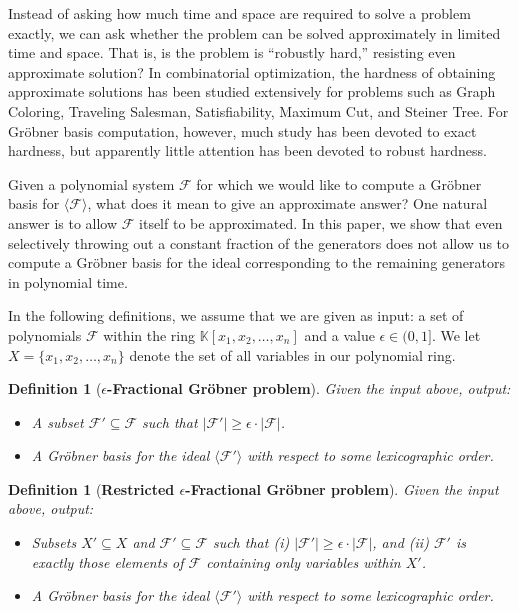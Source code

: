 \documentclass{article}
\newcommand{\F}[0]{\mathcal{F}}
\newcommand{\K}[0]{\mathbb{K}}
\newcommand{\ep}[0]{\epsilon}
\newtheorem{defn}[thm]{Definition}
\begin{document}
Instead of asking how much time and space are required to solve a problem exactly, we can ask whether the problem can be solved approximately in limited time and space.  That is, is the problem is ``robustly hard,'' resisting even approximate solution? In combinatorial optimization, the hardness of obtaining approximate solutions has been studied extensively for problems such as Graph Coloring, Traveling Salesman, Satisfiability, Maximum Cut, and Steiner Tree. For Gr\"{o}bner basis computation, however, much study has been devoted to exact hardness, but apparently little attention has been devoted to robust hardness.

Given a polynomial system $\F$ for which we would like to compute a Gr\"{o}bner basis for  $\langle\F\rangle$, what does it mean to give an approximate answer? One natural answer is to allow $\F$ itself to be approximated. In this paper, we show that even selectively throwing out a constant fraction of the generators does not allow us to compute a Gr\"{o}bner basis for the ideal corresponding to the remaining generators in polynomial time.


In the following definitions, we assume that we are given as input:  a set of polynomials $\F$ within the ring $\K[x_1,x_2,\ldots,x_n]$ and a value $\ep\in (0,1]$. We let $X=\{x_1,x_2,\ldots,x_n\}$ denote the set of all variables in our polynomial ring.
\begin{defn}[\textbf{$\ep$\nobreakdash-Fractional Gr\"obner problem}]
\label{def:fractional}
Given the input above, output:
\begin{itemize}
\item A subset $\F'\subseteq \F$ such that $|\F'| \ge \ep\cdot |\F|$.
\item A Gr\"{o}bner basis for the ideal $\langle\F'\rangle$ with respect to some lexicographic order.
\end{itemize}
\end{defn}

\begin{defn}[\textbf{Restricted $\ep$\nobreakdash-Fractional Gr\"{o}bner problem}]
\label{def:restricted}
Given the input above, output:
\begin{itemize}
\item Subsets $X'\subseteq X$ and $\F'\subseteq \F$ such that (i) $|\F'| \ge \ep\cdot |\F|$, and (ii) $\F'$ is exactly those elements of $\F$ containing only variables within $X'$.
\item A Gr\"{o}bner basis for the ideal $\langle\F'\rangle$ with respect to some lexicographic order.
\end{itemize}
\end{defn}
\end{document}
